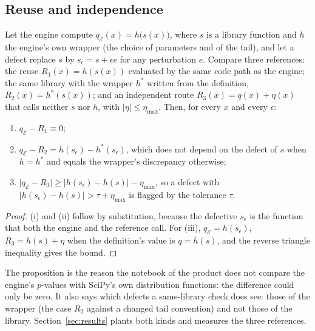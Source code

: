 \subsection{Reuse and independence}
\label{sec:theory-reuse}

\begin{proposition}\label{prop:reuse}
Let the engine compute $q_{\mathcal{E}}(x)=h\bigl(s(x)\bigr)$, where $s$ is a library function and $h$ the engine's own wrapper (the choice of parameters and of the tail), and let a defect replace $s$ by $s_\epsilon=s+\epsilon e$ for any perturbation $e$. Compare three references: the reuse $R_1(x)=h(s(x))$ evaluated by the same code path as the engine; the same library with the wrapper $h^{*}$ written from the definition, $R_2(x)=h^{*}(s(x))$; and an independent route $R_3(x)=q(x)+\eta(x)$ that calls neither $s$ nor $h$, with $\lvert\eta\rvert\le\eta_{\max}$. Then, for every $x$ and every $\epsilon$:
\begin{enumerate}
\item[(i)] $q_{\mathcal{E}}-R_1\equiv0$;
\item[(ii)] $q_{\mathcal{E}}-R_2=h(s_\epsilon)-h^{*}(s_\epsilon)$, which does not depend on the defect of $s$ when $h=h^{*}$ and equals the wrapper's discrepancy otherwise;
\item[(iii)] $\lvert q_{\mathcal{E}}-R_3\rvert\ge\lvert h(s_\epsilon)-h(s)\rvert-\eta_{\max}$, so a defect with $\lvert h(s_\epsilon)-h(s)\rvert>\tau+\eta_{\max}$ is flagged by the tolerance $\tau$.
\end{enumerate}
\end{proposition}
\begin{proof}
(i) and (ii) follow by substitution, because the defective $s_\epsilon$ is the function that both the engine and the reference call. For (iii), $q_{\mathcal{E}}=h(s_\epsilon)$, $R_3=h(s)+\eta$ when the definition's value is $q=h(s)$, and the reverse triangle inequality gives the bound. \qedhere
\end{proof}

The proposition is the reason the notebook of the product does not compare the engine's $p$-values with SciPy's own distribution functions: the difference could only be zero. It also says which defects a same-library check does see: those of the wrapper (the case $R_2$ against a changed tail convention) and not those of the library. Section~\ref{sec:results} plants both kinds and measures the three references.

